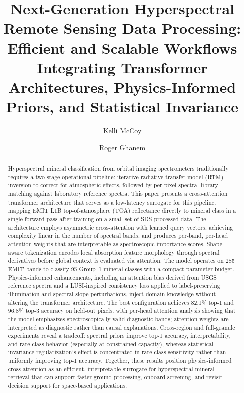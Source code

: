 \documentclass[preprint,12pt]{elsarticle}
\begin{document}
\begin{frontmatter}

\title{Next-Generation Hyperspectral Remote Sensing Data Processing: Efficient and Scalable Workflows Integrating Transformer Architectures, Physics-Informed Priors, and Statistical Invariance}

\author[usc]{Kelli McCoy}

\author[usc]{Roger Ghanem}

\address[usc]{Department of Civil and Environmental Engineering, Viterbi School of Engineering, University of Southern California, Los Angeles, CA 90089, USA}

\begin{abstract}
Hyperspectral mineral classification from orbital imaging spectrometers traditionally requires a two-stage operational pipeline: iterative radiative transfer model (RTM) inversion to correct for atmospheric effects, followed by per-pixel spectral-library matching against laboratory reference spectra.
This paper presents a cross-attention transformer architecture that serves as a low-latency surrogate for this pipeline, mapping EMIT L1B top-of-atmosphere (TOA) reflectance directly to mineral class in a single forward pass after training on a small set of SDS-processed data.
The architecture employs asymmetric cross-attention with learned query vectors, achieving complexity linear in the number of spectral bands, and produces per-band, per-head attention weights that are interpretable as spectroscopic importance scores. 
Shape-aware tokenization encodes local absorption feature morphology through spectral derivatives before global context is evaluated via attention. 
The model operates on 285 EMIT bands to classify 95 Group~1 mineral classes with a compact parameter budget. 
Physics-informed enhancements, including an attention bias derived from USGS reference spectra and a LUSI-inspired consistency loss applied to label-preserving illumination and spectral-slope perturbations, inject domain knowledge without altering the transformer architecture.
The best configuration achieves 82.1\% top-1 and 96.8\% top-3 accuracy on held-out pixels, with per-head attention analysis showing that the model emphasizes spectroscopically valid diagnostic bands; attention weights are interpreted as diagnostic rather than causal explanations.
Cross-region and full-granule experiments reveal a tradeoff: spectral priors improve top-1 accuracy, interpretability, and rare-class behavior (especially at constrained capacity), whereas statistical-invariance regularization's effect is concentrated in rare-class sensitivity rather than uniformly improving top-1 accuracy.
Together, these results position physics-informed cross-attention as an efficient, interpretable surrogate for hyperspectral mineral retrieval that can support faster ground processing, onboard screening, and revisit decision support for space-based applications.
\end{abstract}


\end{frontmatter}
\end{document}
